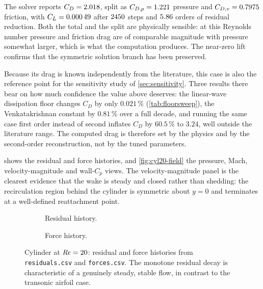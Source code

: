 The solver reports $C_D=\num{2.018}$, split as
$C_{D,p}=\num{1.221}$ pressure and $C_{D,v}=\num{0.7975}$ friction, with
$C_L=\num{0.00049}$ after $\num{2450}$ steps and
$\num{5.86}$ orders of residual reduction. Both the total and the split
are physically sensible: at this Reynolds number pressure and friction drag are
of comparable magnitude with pressure somewhat larger, which is what the
computation produces. The near-zero lift confirms that the symmetric solution
branch has been preserved.

Because its drag is known independently from the literature, this case is also the
reference point for the sensitivity study of \cref{sec:sensitivity}. Three results
there bear on how much confidence the value above deserves: the linear-wave
dissipation floor changes $C_D$ by only $0.021\,\%$ (\cref{tab:floorsweep}), the
Venkatakrishnan constant by $0.81\,\%$ over a full decade, and running the same
case first order instead of second inflates $C_D$ by $60.5\,\%$ to $3.24$, well
outside the literature range. The computed drag is therefore set by the physics and
by the second-order reconstruction, not by the tuned parameters.

 shows the residual and force histories, and
\cref{fig:cyl20-field} the pressure, Mach, velocity-magnitude and wall-$C_p$
views. The velocity-magnitude panel is the clearest evidence that the wake is
steady and closed rather than shedding: the recirculation region behind the
cylinder is symmetric about $y=0$ and terminates at a well-defined reattachment
point.

\begin{figure}[htbp]
  \centering
  \begin{subfigure}{0.49\textwidth}\centering
    \caption{Residual history.}
  \end{subfigure}\hfill
  \begin{subfigure}{0.49\textwidth}\centering
    \caption{Force history.}
  \end{subfigure}
  \caption{Cylinder at $\mathit{Re}=20$: residual and force histories from
  \texttt{residuals.csv} and \texttt{forces.csv}. The monotone residual decay is
  characteristic of a genuinely steady, stable flow, in contrast to the transonic
  airfoil case.}
  \label{fig:cyl20-hist}
\end{figure}

